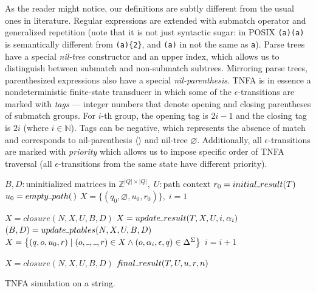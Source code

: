 \documentclass[AMA,STIX1COL]{WileyNJD-v2}
\newcommand{\Xm}{\langle\!\rangle}
\newcommand{\Xund}{\rule{.4em}{.4pt}}
\newcommand{\YN}{\mathbb{N}}
\newcommand{\YZ}{\mathbb{Z}}
\begin{document}
As the reader might notice, our definitions are subtly different from the usual ones in literature.
Regular expressions are extended with submatch operator
and generalized repetition (note that it is not just syntactic sugar: in POSIX \texttt{(a)(a)} is semantically different from \texttt{(a)\{2\}},
and \texttt{(a)} in not the same as \texttt{a}).
Parse trees have a special \emph{nil-tree} constructor
and an upper index, which allows us to distinguish between submatch and non-submatch subtrees.
Mirroring parse trees, parenthesized expressions also have a special \emph{nil-parenthesis}.
TNFA is in essence a nondeterministic finite-state transducer
in which some of the $\epsilon$-transitions are marked with \emph{tags} ---
integer numbers that denote opening and closing parentheses of submatch groups.
For $i$-th group, the opening tag is $2i - 1$ and the closing tag is $2i$ (where $i \in \YN$).
Tags can be negative, which represents the absence of match and corresponds to nil-parenthesis $\Xm$ and nil-tree $\varnothing$.
Additionally, all $\epsilon$-transitions are marked with \emph{priority}
which allows us to impose specific order of TNFA traversal
(all $\epsilon$-transitions from the same state have different priority).
\\

\begin{algorithm}[H] \DontPrintSemicolon {} 
 {

    $B, D : \text{uninitialized matrices in } \YZ^{|Q| \times |Q|}, \; U: \text{path context}$ \;
    $r_0 = initial \Xund result(T)$ \;
    $u_0 = empty \Xund path(\,)$ \;
    $X = \big\{ (q_0, \varnothing, u_0, r_0) \big\}, \; i = 1$ \;

    \BlankLine
     {
        $X = closure(N, X, U, B, D)$ \;
        $X = update \Xund result(T, X, U, i, \alpha_i)$ \;
        $(B, D) = update \Xund ptables(N, X, U, B, D)$ \;
        $X = \big\{ (q, o, u_0, r) \mid (o, \Xund, \Xund, r) \in X \wedge (o, \alpha_i, \epsilon, q) \in \Delta^\Sigma \big\}$ \;
        $i = i + 1$ \;
    }

    \BlankLine
    $X = closure(N, X, U, B, D)$ \;
    \If {$(q_f, \Xund, u, r) \in X$} {
        \Return $f\!inal \Xund result (T, U, u, r, n)$
    } \lElse {
        \Return $\varnothing$
    }

    \BlankLine
}
\caption{TNFA simulation on a string.}\label{alg_match}
\end{algorithm}
\medskip
\end{document}
